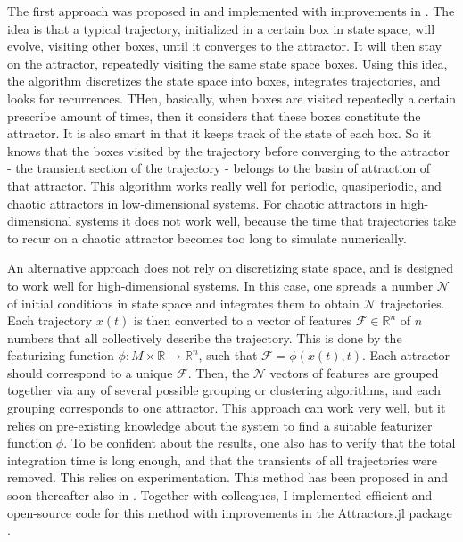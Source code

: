 The first approach was proposed in  and implemented with improvements in . The idea is that a typical trajectory, initialized in a certain box in state space, will evolve, visiting other boxes, until it converges to the attractor. It will then stay on the attractor, repeatedly visiting the same state space boxes. Using this idea, the algorithm discretizes the state space into boxes, integrates trajectories, and looks for recurrences. THen, basically, when boxes are visited repeatedly a certain prescribe amount of times, then it considers that these boxes constitute the attractor. It is also smart in that it keeps track of the state of each box. So it knows that the boxes visited by the trajectory before converging to the attractor - the transient section of the trajectory - belongs to the basin of attraction of that attractor. This algorithm works really well for periodic, quasiperiodic, and chaotic attractors in low-dimensional systems. For chaotic attractors in high-dimensional systems it does not work well, because the time that trajectories take to recur on a chaotic attractor becomes too long to simulate numerically. 

An alternative approach does not rely on discretizing state space, and is designed to work well for high-dimensional systems. In this case, one spreads a number $\mathcal{N}$ of initial conditions in state space and integrates them to obtain $\mathcal{N}$ trajectories. Each trajectory $x(t)$ is then converted to a vector of features $\mathcal{F} \in \mathbb{R}^n$ of $n$ numbers that all collectively describe the trajectory. This is done by the featurizing function $\phi : M \times \mathbb{R} \to \mathbb{R}^n$, such that $\mathcal{F} = \phi(x(t), t)$. Each attractor should correspond to a unique $\mathcal{F}$. Then, the $\mathcal{N}$ vectors of features are grouped together via any of several possible grouping or clustering algorithms, and each grouping corresponds to one attractor. This approach can work very well, but it relies on pre-existing knowledge about the system to find a suitable featurizer function $\phi$. To be confident about the results, one also has to verify that the total integration time is long enough, and that the transients of all trajectories were removed. This relies on experimentation. This method has been proposed in  and soon thereafter also in . Together with colleagues, I implemented efficient and open-source code for this method with improvements in the Attractors.jl package .

